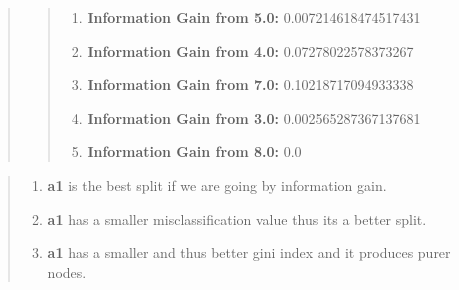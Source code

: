 \documentclass[11pt]{article}
\providecommand{\tightlist}{%
      \setlength{\itemsep}{0pt}\setlength{\parskip}{0pt}}
\begin{document}
\begin{enumerate}
\begin{quote}
\begin{enumerate}
\begin{quote}
\begin{enumerate}
    \item
      \textbf{Information Gain from 5.0:} 0.007214618474517431 
    \item
      \textbf{Information Gain from 4.0:} 0.07278022578373267 
    \item
      \textbf{Information Gain from 7.0:} 0.10218717094933338 
    \item
      \textbf{Information Gain from 3.0:} 0.002565287367137681
    \item
      \textbf{Information Gain from 8.0:} 0.0 
    \end{enumerate}
    \end{quote}
  \end{enumerate}
  \end{quote}
\end{enumerate}

\begin{quote}
\begin{enumerate}
\def\labelenumi{\alph{enumi}.}
\setcounter{enumi}{3}
\tightlist
\item
  \textbf{a1} is the best split if we are going by information gain. 
\item
  \textbf{a1} has a smaller misclassification value thus its a better
  split. 
\item
  \textbf{a1} has a smaller and thus better gini index and it produces
  purer nodes. 
\end{enumerate}
\end{quote}
\end{document}
